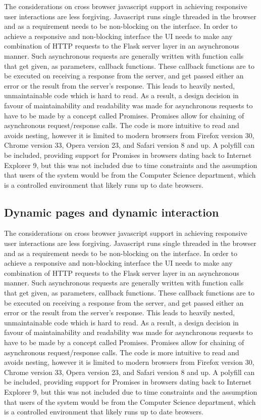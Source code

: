 \documentclass[11pt,a4paper]{article}
\begin{document}
The considerations on cross browser javascript support in achieving responsive user interactions are less forgiving. Javascript runs single threaded in the browser and as a requirement needs to be non-blocking on the interface. In order to achieve a responsive and non-blocking interface the UI needs to make any combination of HTTP requests to the Flask server layer in an asynchronous manner. Such asynchronous requests are generally written with function calls that get given, as parameters, callback functions. These callback functions are to be executed on receiving a response from the server, and get passed either an error or the result from the server’s response. This leads to heavily nested, unmaintainable code which is hard to read. As a result, a design decision in favour of maintainability and readability was made for asynchronous requests to have to be made by a concept called Promises. Promises allow for chaining of asynchronous request/response calls. The code is more intuitive to read and avoids nesting, however it is limited to modern browsers from Firefox version 30, Chrome version 33, Opera version 23, and Safari version 8 and up. A polyfill can be included, providing support for Promises in browsers dating back to Internet Explorer 9, but this was not included due to time constraints and the assumption that users of the system would be from the Computer Science department, which is a controlled environment that likely runs up to date browsers.

\subsection{Dynamic pages and dynamic interaction}

The considerations on cross browser javascript support in achieving responsive user interactions are less forgiving. Javascript runs single threaded in the browser and as a requirement needs to be non-blocking on the interface. In order to achieve a responsive and non-blocking interface the UI needs to make any combination of HTTP requests to the Flask server layer in an asynchronous manner. Such asynchronous requests are generally written with function calls that get given, as parameters, callback functions. These callback functions are to be executed on receiving a response from the server, and get passed either an error or the result from the server’s response. This leads to heavily nested, unmaintainable code which is hard to read. As a result, a design decision in favour of maintainability and readability was made for asynchronous requests to have to be made by a concept called Promises. Promises allow for chaining of asynchronous request/response calls. The code is more intuitive to read and avoids nesting, however it is limited to modern browsers from Firefox version 30, Chrome version 33, Opera version 23, and Safari version 8 and up. A polyfill can be included, providing support for Promises in browsers dating back to Internet Explorer 9, but this was not included due to time constraints and the assumption that users of the system would be from the Computer Science department, which is a controlled environment that likely runs up to date browsers.
\end{document}
